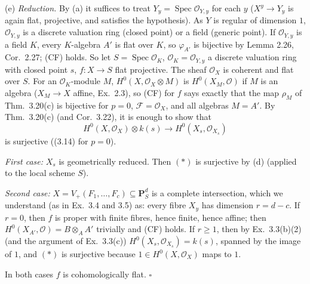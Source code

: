 \documentclass[11pt]{article}
\begin{document}
(e) \emph{Reduction.} By (a) it suffices to treat $Y_y=\operatorname{Spec}\mathcal O_{Y,y}$ for each $y$ ($X^y\to Y_y$ is again flat, projective, and satisfies the hypothesis). As $Y$ is regular of dimension $1$, $\mathcal O_{Y,y}$ is a discrete valuation ring (closed point) or a field (generic point). If $\mathcal O_{Y,y}$ is a field $K$, every $K$-algebra $A'$ is flat over $K$, so $\varphi_{A'}$ is bijective by Lemma 2.26, Cor.~2.27; (CF) holds. So let $S=\operatorname{Spec}\mathcal O_K$, $\mathcal O_K=\mathcal O_{Y,y}$ a discrete valuation ring with closed point $s$, $f:X\to S$ flat projective. The sheaf $\mathcal O_X$ is coherent and flat over $S$. For an $\mathcal O_K$-module $M$, $H^0(X,\mathcal O_X\otimes M)$ is $H^0(X_{M},\mathcal O)$ if $M$ is an algebra ($X_M\to X$ affine, Ex.~2.3), so (CF) for $f$ says exactly that the map $\rho_M$ of Thm.~3.20(c) is bijective for $p=0$, $\mathcal F=\mathcal O_X$, and all algebras $M=A'$. By Thm.~3.20(c) (and Cor.~3.22), it is enough to show that
\[ H^0(X,\mathcal O_X)\otimes k(s)\to H^0(X_s,\mathcal O_{X_s})\tag{$*$} \]
is surjective ((3.14) for $p=0$).

\emph{First case:} $X_s$ is geometrically reduced. Then $(*)$ is surjective by (d) (applied to the local scheme $S$).

\emph{Second case:} $X=V_+(F_1,\dots,F_c)\subseteq\mathbf P^d_S$ is a complete intersection, which we understand (as in Ex.~3.4 and 3.5) as: every fibre $X_y$ has dimension $r=d-c$. If $r=0$, then $f$ is proper with finite fibres, hence finite, hence affine; then $H^0(X_{A'},\mathcal O)=B\otimes_AA'$ trivially and (CF) holds. If $r\ge1$, then by Ex.~3.3(b)(2) (and the argument of Ex.~3.3(c)) $H^0(X_s,\mathcal O_{X_s})=k(s)$, spanned by the image of $1$, and $(*)$ is surjective because $1\in H^0(X,\mathcal O_X)$ maps to $1$.

In both cases $f$ is cohomologically flat. \hfill$\square$
\end{document}
